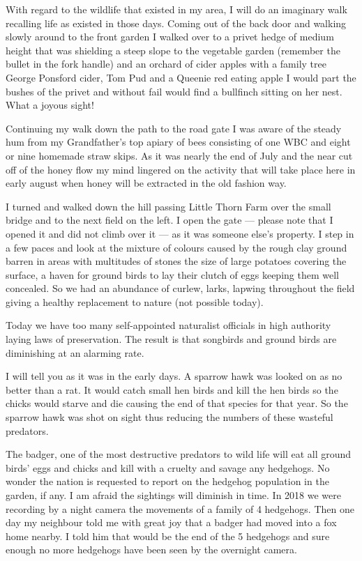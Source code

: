 With regard to the wildlife that existed in my area, I will do an imaginary walk
recalling life as existed in those days.  Coming out of the back door and
walking slowly around to the front garden I walked over to a privet hedge of
medium height that was shielding a steep slope to the vegetable garden
(remember the bullet in the fork handle) and an orchard of cider apples with a
family tree George Ponsford cider, Tom Pud and a Queenie red eating apple I
would part the bushes of the privet and without fail would find a bullfinch
sitting on her nest.  What a joyous sight!

Continuing my walk down the path to the road gate I was aware of the steady hum
from my Grandfather's top apiary of bees consisting of one WBC and eight or
nine homemade straw skips.  As it was nearly the end of July and the near cut
off of the honey flow my mind lingered on the activity that will take place
here in early august when honey will be extracted in the old fashion way.

I turned and walked down the hill passing Little Thorn Farm over the small
bridge and to the next field on the left.  I open the gate --- please note that I
opened it and did not climb over it --- as it was someone else's property.  I
step in a few paces and look at the mixture of colours caused by the rough clay
ground barren in areas with multitudes of stones the size of large potatoes
covering the surface, a haven for ground birds to lay their clutch of eggs
keeping them well concealed.  So we had an abundance of curlew, larks, lapwing
throughout the field giving a healthy replacement to nature (not possible
today).

Today we have too many self-appointed naturalist officials in high authority
laying laws of preservation.  The result is that songbirds and ground birds are
diminishing at an alarming rate.

I will tell you as it was in the early days.  A sparrow hawk was looked on as no
better than a rat.  It would catch small hen birds and kill the hen birds so
the chicks would starve and die causing the end of that species for that year.
So the sparrow hawk was shot on sight thus reducing the numbers of these
wasteful predators.



The badger, one of the most destructive predators to wild life will eat all
ground birds' eggs and chicks and kill with a cruelty and savage any hedgehogs.
No wonder the nation is requested to report on the hedgehog population in the
garden, if any.  I am afraid the sightings will diminish in time.  In 2018 we
were recording by a night camera the movements of a family of 4 hedgehogs. Then
one day my neighbour told me with great joy that a badger had moved into a fox
home nearby. I told him that would be the end of the 5 hedgehogs and sure
enough no more hedgehogs have been seen by the overnight camera.

